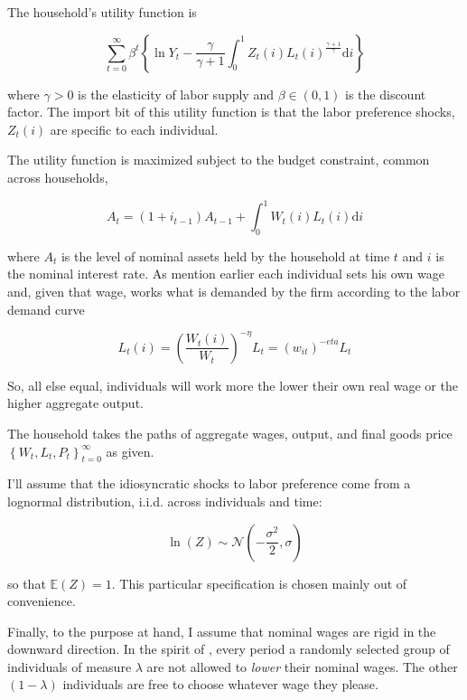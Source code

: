 \documentclass[12pt,a4paper]{scrartcl}            %
\begin{document}
The household's utility function is

\begin{equation} \label{eq:utility}
    \sum_{t=0}^{\infty} \beta^t \left\{\ln Y_t - \frac{\gamma}{\gamma + 1} \int_{0}^{1} Z_t(i)L_t(i)^{\frac{\gamma + 1}{\gamma}}\mathrm{d}i\right\}
\end{equation}

where $\gamma > 0$ is the elasticity of labor supply and $\beta \in (0, 1)$ is the discount factor.
The import bit of this utility function is that the labor preference shocks, $Z_t(i)$ are specific to each individual.

The utility function is maximized subject to the budget constraint, common across households,

\begin{equation}
    \label{eq:budget}
    A_t = \left(1 + i_{t-1}\right)A_{t-1} + \int_{0}^{1} W_t(i)L_t(i)\mathrm{d}i
\end{equation}

where $A_t$ is the level of nominal assets held by the household at time $t$ and $i$ is the nominal interest rate.
As mention earlier each individual sets his own wage and, given that wage, works what is demanded by the firm according to the labor demand curve

\begin{equation}
    \label{eq:labor_demand}
    L_t(i) = \left( \frac{W_t(i)}{W_t} \right)^{-\eta}L_t = (w_{it})^{-eta}L_t
\end{equation}

So, all else equal, individuals will work more the lower their own real wage or the higher aggregate output.

The household takes the paths of aggregate wages, output, and final goods price $\left\{W_t, L_t, P_t \right\}_{t=0}^{\infty}$ as given.

I'll assume that the idiosyncratic shocks to labor preference come from a lognormal distribution, i.i.d. across individuals and time:

\begin{equation}
    \label{eq:shock_dist}
    \ln(Z) \sim \mathcal{N}\left(-\frac{\sigma^2}{2}, \sigma\right)
\end{equation}

so that $\mathbb{E}(Z) = 1$.
This particular specification is chosen mainly out of convenience.

Finally, to the purpose at hand, I assume that nominal wages are rigid in the downward direction.
In the spirit of \cite{calvo_1983}, every period a randomly selected group of individuals of measure $\lambda$ are not allowed to \emph{lower} their nominal wages.
The other $(1 - \lambda)$ individuals are free to choose whatever wage they please.
\end{document}
